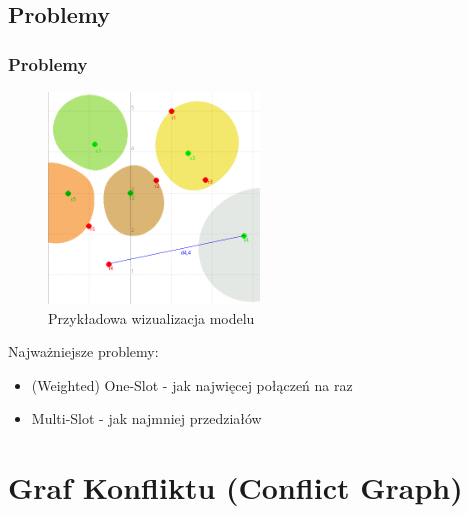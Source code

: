 \documentclass[polish, t,10pt]{beamer}
\begin{document}
\subsection{Problemy}
    \begin{frame}
        \frametitle{Problemy}
        \begin{figure}
            \includegraphics[width=0.5\textwidth]{pictures/model.png}
            \caption{Przykładowa wizualizacja modelu}
        \end{figure}
        Najważniejsze problemy:
        \begin{itemize}
            \item (Weighted) One-Slot - jak najwięcej połączeń na raz
            \item Multi-Slot - jak najmniej przedziałów
        \end{itemize}
    \end{frame}

\section{Graf Konfliktu (Conflict Graph)}
\end{document}
